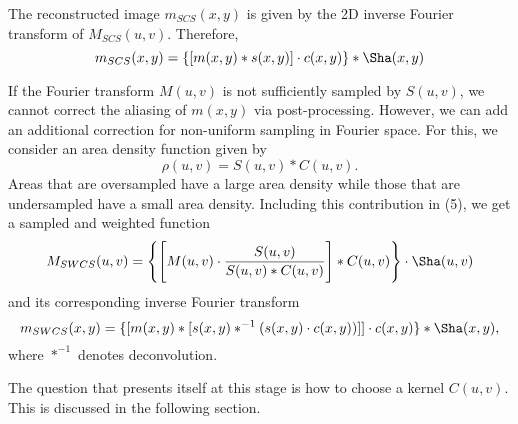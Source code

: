 \documentclass[11pt]{article}
\begin{document}
The reconstructed image $m_{SCS}(x,y)$ is given by the 2D inverse Fourier transform of $M_{SCS}(u,v)$. Therefore,
\begin{equation}
m_{SCS}(x,y) = \{[m(x,y) \ast s(x,y)] \cdot c(x,y)\} \ast \Sha(x,y)
\end{equation}

If the Fourier transform $M(u,v)$ is not sufficiently sampled by $S(u,v)$, we cannot correct the aliasing of $m(x,y)$ via post-processing. However, we can add an additional correction for non-uniform sampling in Fourier space. For this, we consider an area density function given by
\begin{equation}
\rho(u,v) = S(u,v) \ast C(u,v).
\end{equation}
Areas that are oversampled have a large area density while those that are undersampled have a small area density. Including this contribution in (5), we get a sampled and weighted function
\begin{equation}
M_{SWCS}(u,v) = \Bigg\{\Bigg[M(u,v) \cdot \frac{S(u,v)}{S(u,v) \ast C(u,v)}\Bigg] \ast C(u,v)\Bigg\} \cdot \Sha(u,v)
\end{equation}
and its corresponding inverse Fourier transform
\begin{equation}
m_{SWCS}(x,y) =  \{[m(x,y) \ast [s(x,y) \ast^{-1} (s(x,y) \cdot c(x,y))]] \cdot c(x,y)\} \ast \Sha(x,y),
\end{equation}
where $\ast^{-1}$ denotes deconvolution.

The question that presents itself at this stage is how to choose a kernel $C(u,v)$. This is discussed in the following section.
\end{document}
